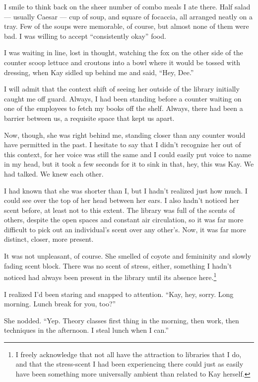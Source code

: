 I smile to think back on the sheer number of combo meals I ate there. Half salad --- usually Caesar --- cup of soup, and square of focaccia, all arranged neatly on a tray. Few of the soups were memorable, of course, but almost none of them were bad. I was willing to accept ``consistently okay'' food.

I was waiting in line, lost in thought, watching the fox on the other side of the counter scoop lettuce and croutons into a bowl where it would be tossed with dressing, when Kay sidled up behind me and said, ``Hey, Dee.''

I will admit that the context shift of seeing her outside of the library initially caught me off guard. Always, I had been standing before a counter waiting on one of the employees to fetch my books off the shelf. Always, there had been a barrier between us, a requisite space that kept us apart.

Now, though, she was right behind me, standing closer than any counter would have permitted in the past. I hesitate to say that I didn't recognize her out of this context, for her voice was still the same and I could easily put voice to name in my head, but it took a few seconds for it to sink in that, hey, this was Kay. We had talked. We knew each other.

I had known that she was shorter than I, but I hadn't realized just how much. I could see over the top of her head between her ears. I also hadn't noticed her scent before, at least not to this extent. The library was full of the scents of others, despite the open spaces and constant air circulation, so it was far more difficult to pick out an individual's scent over any other's. Now, it was far more distinct, closer, more present.

It was not unpleasant, of course. She smelled of coyote and femininity and slowly fading scent block. There was no scent of stress, either, something I hadn't noticed had always been present in the library until its absence here.\footnote{I freely acknowledge that not all have the attraction to libraries that I do, and that the stress-scent I had been experiencing there could just as easily have been something more universally ambient than related to Kay herself.}

I realized I'd been staring and snapped to attention. ``Kay, hey, sorry. Long morning. Lunch break for you, too?''

She nodded. ``Yep. Theory classes first thing in the morning, then work, then techniques in the afternoon. I steal lunch when I can.''

